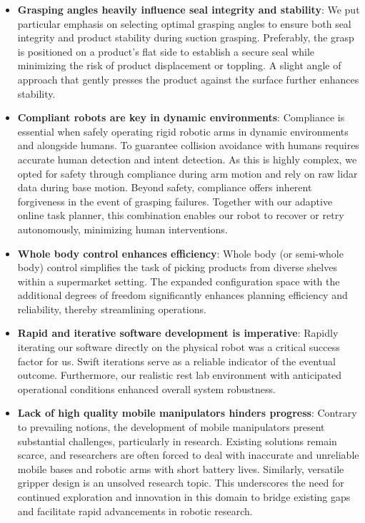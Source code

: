 \begin{itemize}
    \item \textbf{Grasping angles heavily influence seal integrity and stability}:
    We put particular emphasis on selecting optimal grasping angles to ensure both seal integrity and product stability during suction grasping. Preferably, the grasp is positioned on a product's flat side  to establish a secure seal while minimizing the risk of product displacement or toppling. A slight angle of approach that gently presses the product against the surface further enhances stability.

    \item \textbf{Compliant robots are key in dynamic environments}:
    Compliance is essential when safely operating rigid robotic arms in dynamic environments and alongside humans.
    To guarantee collision avoidance with humans requires
    accurate human detection and intent detection. As this
    is highly complex, we opted for safety through
    compliance during arm motion and rely on raw lidar data
    during base motion.
    Beyond safety, compliance offers inherent forgiveness in the event of grasping failures. Together with our adaptive online task planner, this combination enables our robot to recover or retry autonomously, minimizing human interventions. 

    \item \textbf{Whole body control enhances efficiency}:
    Whole body (or semi-whole body) control simplifies the task of picking products from diverse shelves within a supermarket setting. The expanded configuration space with the additional degrees of freedom significantly enhances planning efficiency and reliability, thereby streamlining operations.

    \item \textbf{Rapid and iterative software development is imperative}:
    Rapidly iterating our software directly on the physical robot was a critical success factor for us. Swift iterations serve as a reliable indicator of the eventual outcome. Furthermore, our realistic rest lab environment with anticipated operational conditions enhanced overall system robustness.

    \item \textbf{Lack of high quality mobile manipulators hinders progress}:
    Contrary to prevailing notions, the development of mobile manipulators present substantial challenges, particularly in research. Existing solutions remain scarce, and researchers are often forced to deal with inaccurate and unreliable mobile bases and robotic arms with short battery lives. Similarly, versatile gripper design is an unsolved research topic. This underscores the need for continued exploration and innovation in this domain to bridge existing gaps and facilitate rapid advancements in robotic research.   
\end{itemize}
